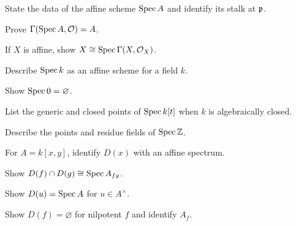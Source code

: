 \begin{exercise}\label{ex:vi18-01}
State the data of the affine scheme $\operatorname{Spec} A$ and identify its stalk at $\mathfrak p$.
\end{exercise}

\begin{exercise}\label{ex:vi18-02}
Prove $\Gamma(\operatorname{Spec} A,\mathcal O)=A$.
\end{exercise}

\begin{exercise}\label{ex:vi18-03}
If $X$ is affine, show $X\cong\operatorname{Spec}\Gamma(X,\mathcal O_X)$.
\end{exercise}

\begin{exercise}\label{ex:vi18-04}
Describe $\operatorname{Spec} k$ as an affine scheme for a field $k$.
\end{exercise}

\begin{exercise}\label{ex:vi18-05}
Show $\operatorname{Spec} 0=\varnothing$.
\end{exercise}

\begin{exercise}\label{ex:vi18-06}
List the generic and closed points of $\operatorname{Spec} k[t]$ when $k$ is algebraically closed.
\end{exercise}

\begin{exercise}\label{ex:vi18-07}
Describe the points and residue fields of $\operatorname{Spec}\mathbb Z$.
\end{exercise}

\begin{exercise}\label{ex:vi18-08}
For $A=k[x,y]$, identify $D(x)$ with an affine spectrum.
\end{exercise}

\begin{exercise}[Intersection]\label{ex:vi18-09}
Show $D(f)\cap D(g)\cong\operatorname{Spec} A_{fg}$.
\end{exercise}

\begin{exercise}\label{ex:vi18-10}
Show $D(u)=\operatorname{Spec} A$ for $u\in A^\times$.
\end{exercise}

\begin{exercise}\label{ex:vi18-11}
Show $D(f)=\varnothing$ for nilpotent $f$ and identify $A_f$.
\end{exercise}

